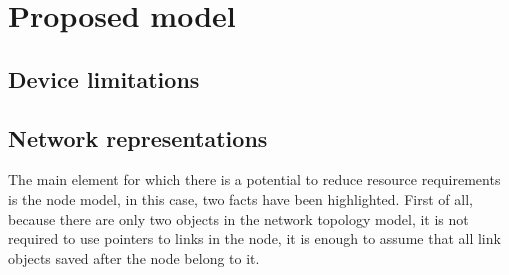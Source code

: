 \FloatBarrier
\chapter{Proposed model}

\FloatBarrier
\section{Device limitations}

\FloatBarrier
\section{Network representations}
The main element for which there is a potential to reduce resource requirements is the node model, 
in this case, two facts have been highlighted. 
First of all, because there are only two objects in the network topology model, it is not required 
to use pointers to links in the node, it is enough to assume that all link objects 
saved after the node belong to it.



